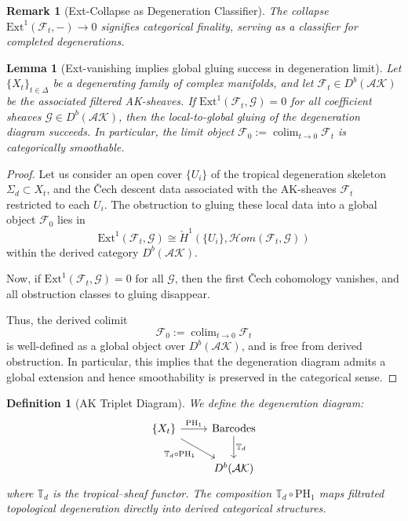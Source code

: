 \documentclass[11pt]{article}
\DeclareMathOperator{\colim}{colim}
\newtheorem{definition}[theorem]{Definition}
\newtheorem{remark}[theorem]{Remark}
\newtheorem{lemma}[theorem]{Lemma}
\begin{document}
\begin{remark}[Ext-Collapse as Degeneration Classifier]
The collapse \( \mathrm{Ext}^1(\mathcal{F}_t, -) \to 0 \) signifies categorical finality, serving as a classifier for completed degenerations.
\end{remark}

\begin{lemma}[Ext-vanishing implies global gluing success in degeneration limit]
Let \( \{X_t\}_{t \in \Delta} \) be a degenerating family of complex manifolds,  
and let \( \mathcal{F}_t \in D^b(\mathcal{AK}) \) be the associated filtered AK-sheaves.  
If \( \mathrm{Ext}^1(\mathcal{F}_t, \mathcal{G}) = 0 \) for all coefficient sheaves \( \mathcal{G} \in D^b(\mathcal{AK}) \), then the local-to-global gluing of the degeneration diagram succeeds.  
In particular, the limit object \( \mathcal{F}_0 := \colim_{t \to 0} \mathcal{F}_t \) is categorically smoothable.
\end{lemma}

\begin{proof}
Let us consider an open cover \( \{U_i\} \) of the tropical degeneration skeleton \( \Sigma_d \subset X_t \),  
and the Čech descent data associated with the AK-sheaves \( \mathcal{F}_t \) restricted to each \( U_i \).  
The obstruction to gluing these local data into a global object \( \mathcal{F}_0 \) lies in  
\[
\mathrm{Ext}^1(\mathcal{F}_t, \mathcal{G}) \cong \check{H}^1(\{U_i\}, \mathcal{H}om(\mathcal{F}_t, \mathcal{G}))
\]
within the derived category \( D^b(\mathcal{AK}) \).

Now, if \( \mathrm{Ext}^1(\mathcal{F}_t, \mathcal{G}) = 0 \) for all \( \mathcal{G} \),  
then the first Čech cohomology vanishes, and all obstruction classes to gluing disappear.

Thus, the derived colimit
\[
\mathcal{F}_0 := \colim_{t \to 0} \mathcal{F}_t
\]
is well-defined as a global object over \( D^b(\mathcal{AK}) \), and is free from derived obstruction.  
In particular, this implies that the degeneration diagram admits a global extension and hence smoothability is preserved in the categorical sense.
\end{proof}

\begin{definition}[AK Triplet Diagram]
We define the degeneration diagram:
\[
\begin{tikzcd}
\{X_t\} \arrow[r, "\mathrm{PH}_1"] \arrow[dr, swap, "\mathbb{T}_d \circ \mathrm{PH}_1"] & \text{Barcodes} \arrow[d, "\mathbb{T}_d"] \\
& D^b(\mathcal{AK})
\end{tikzcd}
\]
where $\mathbb{T}_d$ is the tropical--sheaf functor. The composition $\mathbb{T}_d \circ \mathrm{PH}_1$ maps filtrated topological degeneration directly into derived categorical structures.
\end{definition}
\end{document}
